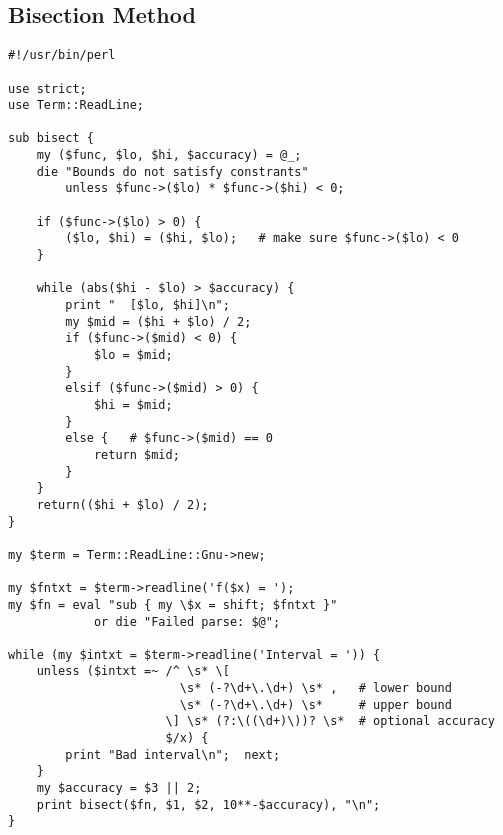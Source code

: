 \documentclass[12pt]{article}
\begin{document}
\subsection*{Bisection Method}
\begin{verbatim}
#!/usr/bin/perl

use strict;
use Term::ReadLine;

sub bisect {
    my ($func, $lo, $hi, $accuracy) = @_;
    die "Bounds do not satisfy constrants"
        unless $func->($lo) * $func->($hi) < 0;

    if ($func->($lo) > 0) {
        ($lo, $hi) = ($hi, $lo);   # make sure $func->($lo) < 0
    }

    while (abs($hi - $lo) > $accuracy) {
        print "  [$lo, $hi]\n";
        my $mid = ($hi + $lo) / 2;
        if ($func->($mid) < 0) {
            $lo = $mid;
        }
        elsif ($func->($mid) > 0) {
            $hi = $mid;
        }
        else {   # $func->($mid) == 0
            return $mid;
        }
    }
    return(($hi + $lo) / 2);
}

my $term = Term::ReadLine::Gnu->new;

my $fntxt = $term->readline('f($x) = ');
my $fn = eval "sub { my \$x = shift; $fntxt }"
            or die "Failed parse: $@";

while (my $intxt = $term->readline('Interval = ')) {
    unless ($intxt =~ /^ \s* \[
                        \s* (-?\d+\.\d+) \s* ,   # lower bound
                        \s* (-?\d+\.\d+) \s*     # upper bound
                      \] \s* (?:\((\d+)\))? \s*  # optional accuracy
                      $/x) {
        print "Bad interval\n";  next;
    }
    my $accuracy = $3 || 2;
    print bisect($fn, $1, $2, 10**-$accuracy), "\n";
}
\end{verbatim}
\end{document}
